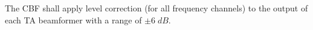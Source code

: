 The CBF shall apply level correction (for all frequency channels) to the
output of each TA beamformer with a range of $\pm 6 \;dB$.
